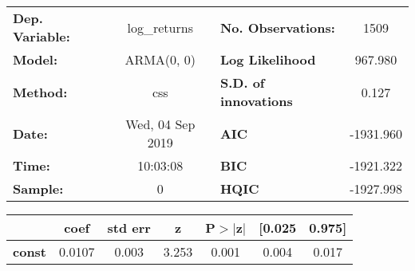 \begin{center}
\begin{tabular}{lclc}
\toprule
\textbf{Dep. Variable:} &   log\_returns   & \textbf{  No. Observations:  } &    1509     \\
\textbf{Model:}         &    ARMA(0, 0)    & \textbf{  Log Likelihood     } &  967.980    \\
\textbf{Method:}        &       css        & \textbf{  S.D. of innovations} &   0.127     \\
\textbf{Date:}          & Wed, 04 Sep 2019 & \textbf{  AIC                } & -1931.960   \\
\textbf{Time:}          &     10:03:08     & \textbf{  BIC                } & -1921.322   \\
\textbf{Sample:}        &        0         & \textbf{  HQIC               } & -1927.998   \\
\bottomrule
\end{tabular}
\begin{tabular}{lcccccc}
               & \textbf{coef} & \textbf{std err} & \textbf{z} & \textbf{P$> |$z$|$} & \textbf{[0.025} & \textbf{0.975]}  \\
\midrule
\textbf{const} &       0.0107  &        0.003     &     3.253  &         0.001        &        0.004    &        0.017     \\
\bottomrule
\end{tabular}
\end{center}
